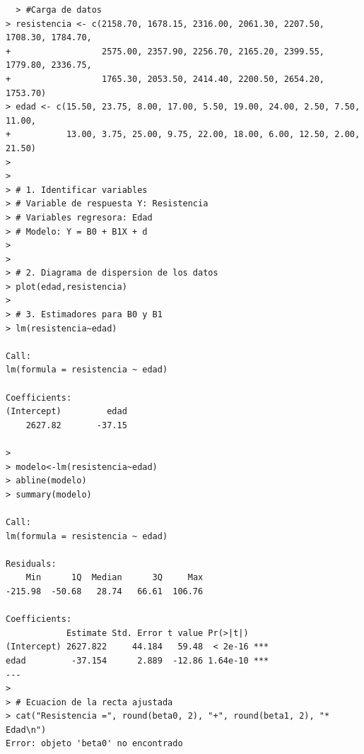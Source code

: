 \documentclass[12pt,a4paper]{article}
\begin{document}
\begin{lstlisting}
  > #Carga de datos
> resistencia <- c(2158.70, 1678.15, 2316.00, 2061.30, 2207.50, 1708.30, 1784.70, 
+                  2575.00, 2357.90, 2256.70, 2165.20, 2399.55, 1779.80, 2336.75, 
+                  1765.30, 2053.50, 2414.40, 2200.50, 2654.20, 1753.70)
> edad <- c(15.50, 23.75, 8.00, 17.00, 5.50, 19.00, 24.00, 2.50, 7.50, 11.00, 
+           13.00, 3.75, 25.00, 9.75, 22.00, 18.00, 6.00, 12.50, 2.00, 21.50)
> 
> 
> # 1. Identificar variables
> # Variable de respuesta Y: Resistencia
> # Variables regresora: Edad
> # Modelo: Y = B0 + B1X + d
> 
> 
> # 2. Diagrama de dispersion de los datos
> plot(edad,resistencia)
> 
> # 3. Estimadores para B0 y B1
> lm(resistencia~edad)

Call:
lm(formula = resistencia ~ edad)

Coefficients:
(Intercept)         edad  
    2627.82       -37.15  

>
> modelo<-lm(resistencia~edad)
> abline(modelo)
> summary(modelo)

Call:
lm(formula = resistencia ~ edad)

Residuals:
    Min      1Q  Median      3Q     Max 
-215.98  -50.68   28.74   66.61  106.76 

Coefficients:
            Estimate Std. Error t value Pr(>|t|)    
(Intercept) 2627.822     44.184   59.48  < 2e-16 ***
edad         -37.154      2.889  -12.86 1.64e-10 ***
---
>
> # Ecuacion de la recta ajustada
> cat("Resistencia =", round(beta0, 2), "+", round(beta1, 2), "* Edad\n")
Error: objeto 'beta0' no encontrado


\end{lstlisting}
\end{document}

